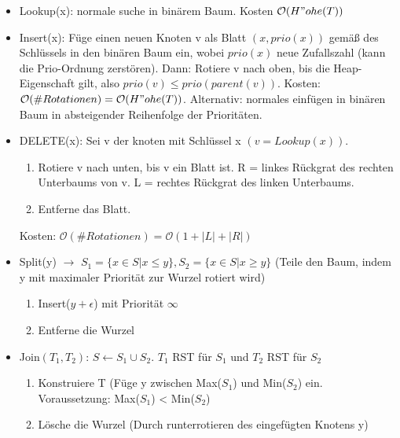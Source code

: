 \documentclass[10pt,a4paper]{article}
\begin{document}
\begin{itemize}
	\item Lookup(x): normale suche in binärem Baum. Kosten $ \mathcal{O}(H"ohe(T)) $
	\item Insert(x): Füge einen neuen Knoten v als Blatt $ (x, prio(x)) $ gemäß des Schlüssels in den binären Baum ein, wobei $ prio(x) $ neue Zufallszahl (kann die Prio-Ordnung zerstören). Dann: Rotiere v nach oben, bis die Heap-Eigenschaft gilt, also $ prio(v) \leq prio(parent(v)) $. 
	\subitem Kosten: $\mathcal{O}(\#Rotationen) = \mathcal{O}(H"ohe(T))$. Alternativ: normales einfügen in binären Baum in absteigender Reihenfolge der Prioritäten.
	\item DELETE(x): Sei v der knoten mit Schlüssel x $(v = Lookup(x))$. 
	\begin{enumerate}
		\item Rotiere v nach unten, bis v ein Blatt ist. R = linkes Rückgrat des rechten Unterbaums von v. L = rechtes Rückgrat des linken Unterbaums. 
		\item Entferne das Blatt.
	\end{enumerate}
	\subitem Kosten: $\mathcal{O}(\#Rotationen) = \mathcal{O}(1 + |L| + |R|)$
	\item Split(y) $ \rightarrow $ $ S_1=\{x\in S | x \leq y\}, S_2=\{x\in S | x \geq y\} $ (Teile den Baum, indem y mit maximaler Priorität zur Wurzel rotiert wird)
	\begin{enumerate}
		\item Insert($ y + \epsilon $) mit Priorität $ \infty $
		\item Entferne die Wurzel 
	\end{enumerate}
	\item Join$ (T_1, T_2 )$: $ S\leftarrow S_1 \cup S_2 $. $T_1$ RST für $S_1$ und $T_2$ RST für $S_2$
	\begin{enumerate}
		\item Konstruiere T (Füge y zwischen Max($S_1$) und Min($S_2$) ein. Voraussetzung: Max($S_1$) < Min($S_2$)
		\item Lösche die Wurzel (Durch runterrotieren des eingefügten Knotens y)
	\end{enumerate}
\end{itemize}
\end{document}
